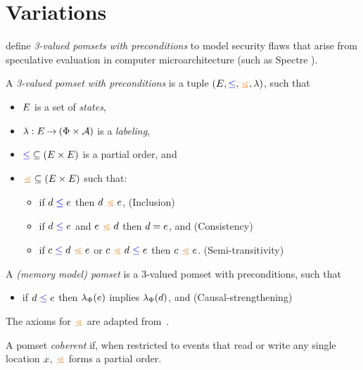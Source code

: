 \section{Variations}

\citet{2019-sp} define \emph{3-valued pomsets with preconditions} to model
security flaws that arise from speculative evaluation in computer
microarchitecture (such as Spectre \cite{DBLP:journals/corr/abs-1801-01203}).
\begin{definition}
  A \emph{3-valued pomset with preconditions} is a tuple
  $(\Event, {\le}, {\gtN}, \labeling)$, such that
  \begin{itemize}
  \item $E$ is a set of \emph{states},
  \item $\lambda: E \mathbin\rightarrow (\Phi\times\mathcal{A})$ is a \emph{labeling},
  \item ${\mathrel{{\color{blue}\leq}}} \subseteq (E\times E)$ is a partial order, and
  \item ${\gtN} \subseteq (\Event\times\Event)$ such that:
    \begin{itemize}
    \item\label{5a} if $d \mathrel{{\color{blue}\leq}} e$ then $\bEv \gtN \aEv$, \hfill
      (Inclusion)
    \item\label{5b} if $d \mathrel{{\color{blue}\leq}} e$ and $\aEv \gtN \bEv$ then
      $d = e$, and \hfill (Consistency)
    \item\label{5c} if $\cEv \le \bEv \gtN \aEv$ or $\cEv \gtN \bEv \le \aEv$
      then $\cEv \gtN \aEv$.  \hfill (Semi-transitivity)
    \end{itemize}
  \end{itemize}

  A \emph{(memory model) pomset} is a 3-valued pomset with preconditions,
  such that
  \begin{itemize}
  \item if $d\mathrel{{\color{blue}\leq}}e$ then $\lambda_{\Phi}(e)$ implies
    $\lambda_{\Phi}(d)$, and \hfill (Causal-strengthening)
  \end{itemize}
\end{definition}
The axioms for $\gtN$ are adapted
from~\citet[A1--A3]{DBLP:journals/dc/Lamport86}.  

\begin{definition}
  A pomset \emph{coherent} if, when restricted to events that read or write
  any single location $x$, $\gtN$ forms a partial order.
\end{definition}
